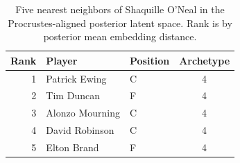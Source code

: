 \begin{table}[htbp]
  \centering\small
  \begin{tabular}{rllc}
    \toprule
    Rank & Player & Position & Archetype \\
    \midrule
    1 & Patrick Ewing & C & 4 \\
    2 & Tim Duncan & F & 4 \\
    3 & Alonzo Mourning & C & 4 \\
    4 & David Robinson & C & 4 \\
    5 & Elton Brand & F & 4 \\
    \bottomrule
  \end{tabular}
  \caption{Five nearest neighbors of Shaquille O'Neal in the Procrustes-aligned posterior latent space. Rank is by posterior mean embedding distance.}
  \label{tab:Shaquille_O_Neal_neighbors}
\end{table}

